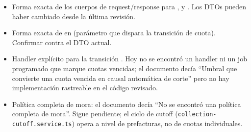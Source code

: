 \begin{itemize}
\item Forma exacta de los cuerpos de request/response para \texttt{}, \texttt{} y \texttt{}. Los DTOs pueden haber cambiado desde la última revisión.
\item Forma exacta de \texttt{} en \texttt{} (parámetro que dispara la transición de cuota). Confirmar contra el DTO actual.
\item Handler explícito para la transición \texttt{}. Hoy no se encontró un handler ni un job programado que marque cuotas vencidas; el documento decía ``Umbral que convierte una cuota vencida en causal automática de corte'' pero no hay implementación rastreable en el código revisado.
\item Política completa de mora: el documento decía ``No se encontró una política completa de mora''. Sigue pendiente; el ciclo de cutoff (\texttt{collection-cutoff.service.ts}) opera a nivel de prefacturas, no de cuotas individuales.
\end{itemize}
